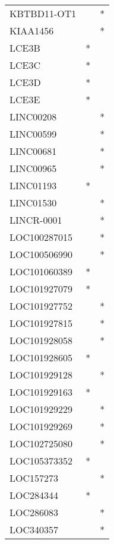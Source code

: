 \begin{longtable}{lcc}
KBTBD11-OT1  &                &          * \\
KIAA1456     &                &          * \\
LCE3B        &              * &            \\
LCE3C        &              * &            \\
LCE3D        &              * &            \\
LCE3E        &              * &            \\
LINC00208    &                &          * \\
LINC00599    &                &          * \\
LINC00681    &                &          * \\
LINC00965    &                &          * \\
LINC01193    &              * &            \\
LINC01530    &                &          * \\
LINCR-0001   &                &          * \\
LOC100287015 &                &          * \\
LOC100506990 &                &          * \\
LOC101060389 &              * &            \\
LOC101927079 &              * &            \\
LOC101927752 &                &          * \\
LOC101927815 &                &          * \\
LOC101928058 &                &          * \\
LOC101928605 &              * &            \\
LOC101929128 &                &          * \\
LOC101929163 &              * &            \\
LOC101929229 &                &          * \\
LOC101929269 &                &          * \\
LOC102725080 &                &          * \\
LOC105373352 &              * &            \\
LOC157273    &                &          * \\
LOC284344    &              * &            \\
LOC286083    &                &          * \\
LOC340357    &                &          * \\

\end{longtable}
